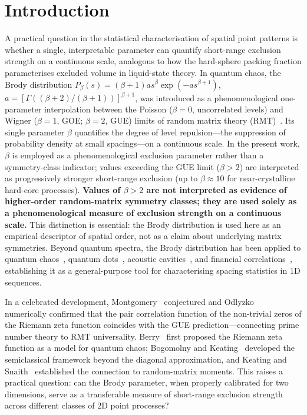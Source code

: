 \documentclass[final,1p,times]{elsarticle}
\theoremstyle{definition}
\begin{document}
\section{Introduction}

A practical question in the statistical characterisation of spatial
point patterns is whether a single, interpretable parameter can
quantify short-range exclusion strength on a continuous scale,
analogous to how the hard-sphere packing fraction parameterises
excluded volume in liquid-state theory. In quantum chaos,
the Brody distribution
$P_\beta(s) = (\beta+1) a s^\beta \exp(-a s^{\beta+1})$,
$a = [\Gamma((\beta+2)/(\beta+1))]^{\beta+1}$,
was introduced as a phenomenological one-parameter interpolation
between the Poisson ($\beta=0$, uncorrelated levels) and Wigner
($\beta=1$, GOE; $\beta=2$, GUE) limits of random matrix theory
(RMT)~\cite{BRODY-1981}. Its single parameter
$\beta$ quantifies the degree of level repulsion---the suppression
of probability density at small spacings---on a continuous scale. In the present work, $\beta$ is employed
as a phenomenological exclusion parameter rather than a
symmetry-class indicator; values exceeding the GUE limit
($\beta>2$) are interpreted as progressively stronger
short-range exclusion (up to $\beta\approx 10$ for near-crystalline
hard-core processes). \textbf{Values of $\beta>2$ are not interpreted
as evidence of higher-order random-matrix symmetry classes; they are
used solely as a phenomenological measure of exclusion strength on a
continuous scale.} This distinction is essential: the Brody
distribution is used here as an empirical descriptor of spatial
order, not as a claim about underlying matrix symmetries.
Beyond quantum spectra, the Brody distribution has been applied
to quantum chaos~\cite{STOCKMANN-1999}, quantum dots~\cite{ALHASSID-2000},
acoustic cavities~\cite{WEAVER-1989}, and financial
correlations~\cite{LALOUX-1999}, establishing it as a general-purpose
tool for characterising spacing statistics in 1D sequences.

In a celebrated development, Montgomery~\cite{MONTGOMERY-1973} conjectured
and Odlyzko~\cite{ODLYZKO-1987} numerically confirmed that the pair
correlation function of the non-trivial zeros of the Riemann zeta
function coincides with the GUE prediction---connecting prime number
theory to RMT universality. Berry~\cite{BERRY-1986} first proposed the
Riemann zeta function as a model for quantum chaos; Bogomolny and
Keating~\cite{BOGOMOLNY-1996} developed the semiclassical framework
beyond the diagonal approximation, and Keating and
Snaith~\cite{KEATING-1999} established the connection to random-matrix
moments.
This raises a practical question: can the Brody parameter, when
properly calibrated for two dimensions, serve as a transferable
measure of short-range exclusion strength across different classes
of 2D point processes?
\end{document}
